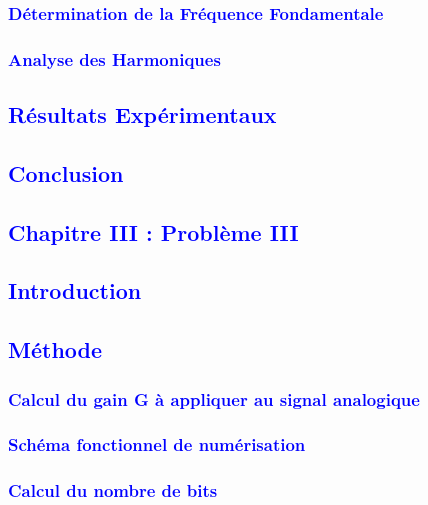 \documentclass{article}
\numberwithin{equation}{section}
\begin{document}

\textcolor{blue}{\subsubsection{Détermination de la Fréquence Fondamentale}}

\textcolor{blue}{\subsubsection{Analyse des Harmoniques}}

\newpage
\textcolor{blue}{\subsection{Résultats Expérimentaux}}

\newpage
\textcolor{blue}{\subsection{Conclusion}}

\textcolor{blue}{\section{Chapitre III : Problème III}}
\textcolor{blue}{\subsection{Introduction}}

\textcolor{blue}{\subsection{Méthode}}
\textcolor{blue}{\subsubsection{Calcul du gain G à appliquer au signal analogique }}

\textcolor{blue}{\subsubsection{Schéma fonctionnel de numérisation }}

\textcolor{blue}{\subsubsection{Calcul du nombre de bits }}
\end{document}
